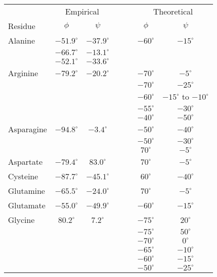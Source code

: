\documentclass[12pt]{article}
\begin{document}
\begin{center}
\footnotesize
\begin{tabular}{lccccc}
&  \multicolumn{2}{c}{Empirical} & ~~~& \multicolumn{2}{c}{Theoretical}\\\cline{2-3}\cline{5-6}
Residue & $\phi$ & $\psi$ & & $\phi$ & $\psi$ \\
\hline Alanine & $-51.9^{\circ}$ & $-37.9^{\circ}$ & & $-60^{\circ}$ & $-15^{\circ}$ \\
                      &  $-66.7^{\circ}$ & $-13.1^{\circ}$ &  &\\
                      & $-52.1^{\circ}$ & $-33.6^{\circ}$ & &\\
Arginine        & $-79.2^{\circ}$ & $-20.2^{\circ}$ & & $-70^{\circ}$ & $-5^{\circ}$ \\
		 &	&	& & $-70^{\circ}$ & $-25^{\circ}$\\
		 &	&	& & $-60^{\circ}$ & $-15^{\circ}$ to $-10^{\circ}$\\
		 &	&	& & $-55^{\circ}$ & $-30^{\circ}$\\
                 &      &       & & $-40^{\circ}$ & $-50^{\circ}$\\      
Asparagine      & $-94.8^{\circ}$ & $-3.4^{\circ}$ & & $-50^{\circ}$ & $-40^{\circ}$ \\
                 &      &       & & $-50^{\circ}$ & $-30^{\circ}$\\
		 &      &       & & $70^{\circ}$ & $-5^{\circ}$\\
Aspartate    & $-79.4^{\circ}$ & $83.0^{\circ}$ & & $70^{\circ}$ & $-5^{\circ}$ \\
Cysteine        & $-87.7^{\circ}$ & $-45.1^{\circ}$ & & $60^{\circ}$ & $-40^{\circ}$ \\
Glutamine      & $-65.5^{\circ}$ & $-24.0^{\circ}$ & & $70^{\circ}$ & $-5^{\circ}$\\
Glutamate     & $-55.0^{\circ}$ & $-49.9^{\circ}$ & & $-60^{\circ}$ & $-15^{\circ}$\\
Glycine          & $80.2^{\circ}$ & $7.2^{\circ}$ & & $-75^{\circ}$ & $20^{\circ}$  \\
                 &      &       & & $-75^{\circ}$ & $50^{\circ}$\\
                 &      &       & & $-70^{\circ}$ & $0^{\circ}$\\
                 &      &       & & $-65^{\circ}$ & $-10^{\circ}$\\
                 &      &       & & $-60^{\circ}$ & $-15^{\circ}$\\
                 &      &       & & $-50^{\circ}$ & $-25^{\circ}$\\

\end{tabular}
\end{center}
\end{document}
